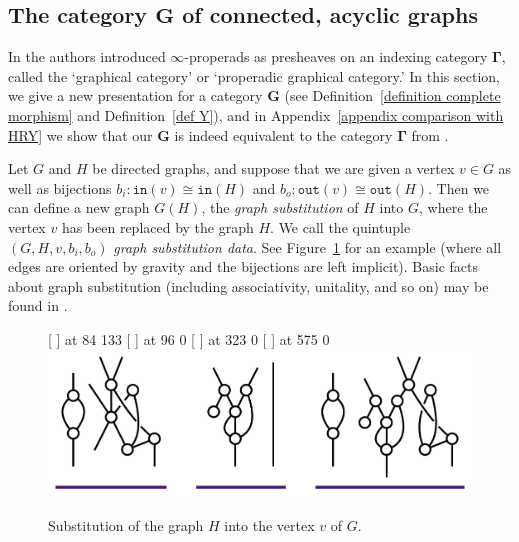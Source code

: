 \documentclass{amsart}
\numberwithin{theorem}{subsection}
\theoremstyle{definition}
\newcommand{\bbY}{\mathbf{G}}
\newcommand{\hryGamma}{\mathbf{\Gamma}}
\newcommand{\out}{\mathtt{out}}
\newcommand{\inp}{\mathtt{in}}
\begin{document}
\subsection{The category \texorpdfstring{$\bbY$}{G} of connected, acyclic graphs}\label{section subcategory bbY}
In \cite{hrybook} the authors introduced $\infty$-properads as presheaves on an indexing category $\hryGamma$, called the `graphical category' or `properadic graphical category.'
In this section, we give a new presentation for a category $\bbY$ (see Definition~\ref{definition complete morphism} and Definition~\ref{def Y}), and in Appendix~\ref{appendix comparison with HRY} we show that our $\bbY$ is indeed equivalent to the category $\hryGamma$ from \cite{hrybook}.


Let $G$ and $H$ be directed graphs, and suppose that we are given a vertex $v\in G$ as well as bijections
$b_i \colon \inp(v) \cong \inp(H)$ and
$b_o \colon \out(v) \cong \out(H)$.
Then we can define a new graph $G(H)$, the \emph{graph substitution} of $H$ into $G$, where the vertex $v$ has been replaced by the graph $H$.
We call the quintuple $(G,H,v,b_i,b_o)$ \emph{graph substitution data}.
See Figure~\ref{figure graph substitution example} for an example (where all edges are oriented by gravity and the bijections are left implicit).
Basic facts about graph substitution (including associativity, unitality, and so on) may be found in \cite{YauJohnson:FPAM}.

\begin{figure}[htb]
\small\hair 2pt
  [ ] at 84 133
  [ ] at 96 0
  [ ] at 323 0
  [ ] at 575 0
\endlabellist
\centering
\includegraphics[width=\textwidth]{graph_substitution}
\caption{Substitution of the graph $H$ into the vertex $v$ of $G$.}
\label{figure graph substitution example}
\end{figure}
\end{document}
